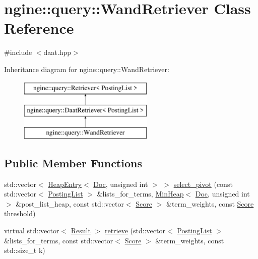 \hypertarget{classngine_1_1query_1_1WandRetriever}{}\section{ngine\+:\+:query\+:\+:Wand\+Retriever Class Reference}
\label{classngine_1_1query_1_1WandRetriever}


{\ttfamily \#include $<$daat.\+hpp$>$}

Inheritance diagram for ngine\+:\+:query\+:\+:Wand\+Retriever\+:\begin{figure}[H]
\begin{center}
\leavevmode
\includegraphics[height=3.000000cm]{classngine_1_1query_1_1WandRetriever}
\end{center}
\end{figure}
\subsection*{Public Member Functions}
\begin{DoxyCompactItemize}
\item 
std\+::vector$<$ \hyperlink{structngine_1_1HeapEntry}{Heap\+Entry}$<$ \hyperlink{structngine_1_1Doc}{Doc}, unsigned int $>$ $>$ \hyperlink{classngine_1_1query_1_1WandRetriever_ac7651d23a4ba30e2399c5ecfa2a48b67}{select\+\_\+pivot} (const std\+::vector$<$ \hyperlink{classngine_1_1PostingList}{Posting\+List} $>$ \&lists\+\_\+for\+\_\+terms, \hyperlink{classngine_1_1MinHeap}{Min\+Heap}$<$ \hyperlink{structngine_1_1Doc}{Doc}, unsigned int $>$ \&post\+\_\+list\+\_\+heap, const std\+::vector$<$ \hyperlink{structngine_1_1Score}{Score} $>$ \&term\+\_\+weights, const \hyperlink{structngine_1_1Score}{Score} threshold)
\item 
virtual std\+::vector$<$ \hyperlink{structngine_1_1query_1_1Result}{Result} $>$ \hyperlink{classngine_1_1query_1_1WandRetriever_a1b8157254522c8897cb174bf0b893b88}{retrieve} (std\+::vector$<$ \hyperlink{classngine_1_1PostingList}{Posting\+List} $>$ \&lists\+\_\+for\+\_\+terms, const std\+::vector$<$ \hyperlink{structngine_1_1Score}{Score} $>$ \&term\+\_\+weights, const std\+::size\+\_\+t k)
\end{DoxyCompactItemize}


